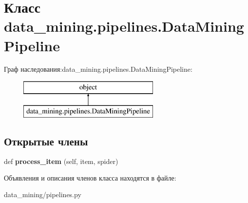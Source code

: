 \hypertarget{classdata__mining_1_1pipelines_1_1DataMiningPipeline}{}\section{Класс data\+\_\+mining.\+pipelines.\+Data\+Mining\+Pipeline}
\label{classdata__mining_1_1pipelines_1_1DataMiningPipeline}
Граф наследования\+:data\+\_\+mining.\+pipelines.\+Data\+Mining\+Pipeline\+:\begin{figure}[H]
\begin{center}
\leavevmode
\includegraphics[height=2.000000cm]{classdata__mining_1_1pipelines_1_1DataMiningPipeline}
\end{center}
\end{figure}
\subsection*{Открытые члены}
\begin{DoxyCompactItemize}
\item 
\mbox{\label{classdata__mining_1_1pipelines_1_1DataMiningPipeline_af3e7be378ecabfdb27f2c4f8129f329b}} 
def {\bfseries process\+\_\+item} (self, item, spider)
\end{DoxyCompactItemize}


Объявления и описания членов класса находятся в файле\+:\begin{DoxyCompactItemize}
\item 
data\+\_\+mining/pipelines.\+py\end{DoxyCompactItemize}
